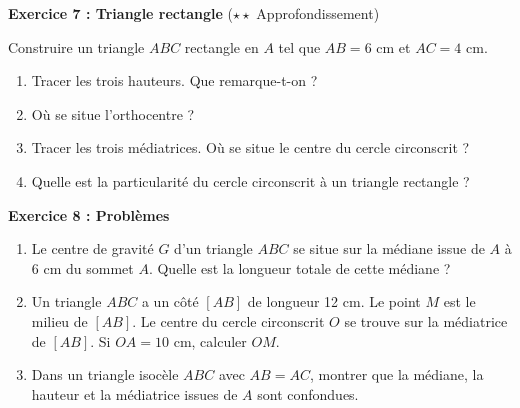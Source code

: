 \begin{exercisebox}
	\textbf{Exercice 7 : Triangle rectangle} ($\star\star$ Approfondissement)

	Construire un triangle $ABC$ rectangle en $A$ tel que $AB = 6$ cm et $AC = 4$ cm.

	\begin{enumerate}[label=\alph*)]
		\item Tracer les trois hauteurs. Que remarque-t-on ?
		\item Où se situe l'orthocentre ?
		\item Tracer les trois médiatrices. Où se situe le centre du cercle circonscrit ?
		\item Quelle est la particularité du cercle circonscrit à un triangle rectangle ?
	\end{enumerate}

	\medskip

	\textbf{Exercice 8 : Problèmes}

	\begin{enumerate}[label=\alph*)]
		\item Le centre de gravité $G$ d'un triangle $ABC$ se situe sur la médiane issue de $A$ à 6 cm du sommet $A$. Quelle est la longueur totale de cette médiane ?

		\item Un triangle $ABC$ a un côté $[AB]$ de longueur 12 cm. Le point $M$ est le milieu de $[AB]$. Le centre du cercle circonscrit $O$ se trouve sur la médiatrice de $[AB]$. Si $OA = 10$ cm, calculer $OM$.

		\item Dans un triangle isocèle $ABC$ avec $AB = AC$, montrer que la médiane, la hauteur et la médiatrice issues de $A$ sont confondues.
	\end{enumerate}
\end{exercisebox}

